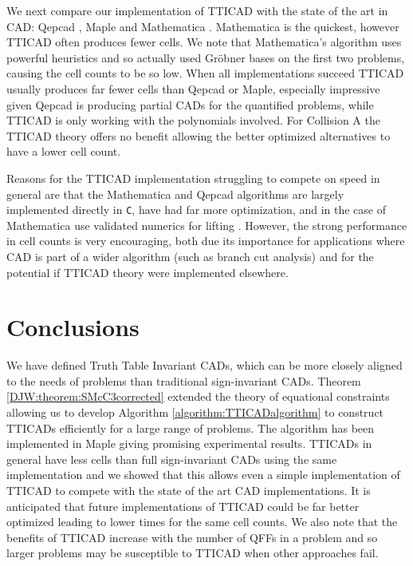\documentclass{article}
\begin{document}
We next compare our implementation of TTICAD with the state of the art in CAD: {\sc Qepcad} \cite{Brown03}, {\sc Maple} \cite{Chenetal2009d} and {\sc Mathematica} \cite{Strzebonski06, Strzebonski10}.  {\sc Mathematica} is the quickest, however TTICAD often produces fewer cells.  We note that {\sc Mathematica}'s algorithm uses powerful heuristics and so actually used Gr\"obner bases on the first two problems, causing the cell counts to be so low.  When all implementations succeed TTICAD usually produces far fewer cells than {\sc Qepcad} or {\sc Maple}, especially impressive given {\sc Qepcad} is producing partial CADs for the quantified problems, while TTICAD is only working with the polynomials involved.  
For Collision A the TTICAD theory offers no benefit allowing the better optimized alternatives to have a lower cell count.
 
Reasons for the TTICAD implementation struggling to compete on speed in general are that the {\sc Mathematica} and {\sc Qepcad} algorithms are largely implemented directly in {\tt C}, have had far more optimization, and in the case of {\sc Mathematica} use validated numerics for lifting \cite{Strzebonski06}.  However, the strong performance in cell counts is very encouraging, both due its importance for applications where CAD is part of a wider algorithm (such as branch cut analysis) and for the potential if TTICAD theory were implemented elsewhere.



\section{Conclusions}
\label{sec:Conc}

We have defined Truth Table Invariant CADs, which can be more closely aligned to the needs of problems than traditional sign-invariant CADs.  Theorem \ref{DJW:theorem:SMcC3corrected} extended the theory of equational constraints allowing us to develop Algorithm \ref{algorithm:TTICADalgorithm} to construct TTICADs efficiently for a large range of problems.  The algorithm has been implemented in {\sc Maple} giving promising experimental results.  TTICADs in general have less cells than full sign-invariant CADs using the same implementation and we showed that this allows even a simple implementation of TTICAD to compete with the state of the art CAD implementations.  It is anticipated that future implementations of TTICAD could be far better optimized leading to lower times for the same cell counts.  We also note that the benefits of TTICAD increase with the number of QFFs in a problem and so larger problems may be susceptible to TTICAD when other approaches fail.
 
\end{document}
